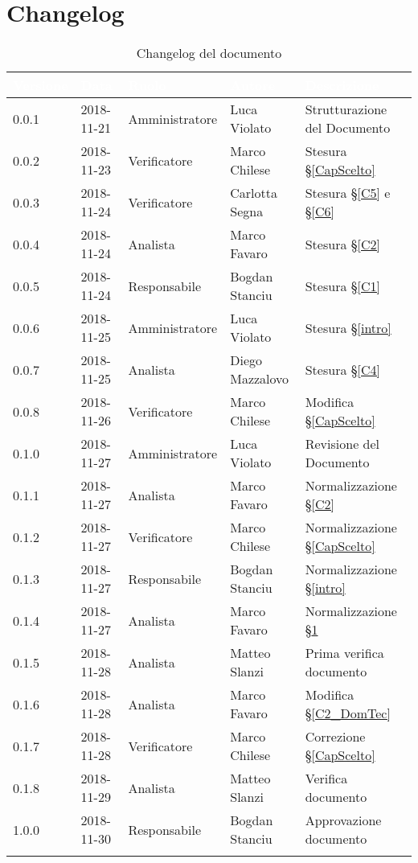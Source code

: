 \section{Changelog}\label{changelog}

\begin{center}
\begin{longtable}[c]{|m{}|m{}|m{}|m{}|p{}|}
\hline
\rowcolor{bluelogo}\textbf{\textcolor{white}{Versione}} & \textbf{\textcolor{white}{Data}}  & \textbf{\textcolor{white}{Ruolo}} & \textbf{\textcolor{white}{Autore}} & \textbf{\textcolor{white}{Descrizione}} \\
\hline \hline
\endfirsthead
0.0.1 & 2018-11-21  & Amministratore & Luca Violato & Strutturazione del Documento \\
\hline
\rowcolor{grigio}0.0.2 & 2018-11-23  & Verificatore & Marco Chilese & Stesura §\ref{CapScelto} \\
\hline
0.0.3 & 2018-11-24  & Verificatore & Carlotta Segna & Stesura §\ref{C5} e §\ref{C6} \\
\hline
\rowcolor{grigio}0.0.4 & 2018-11-24  & Analista & Marco Favaro & Stesura §\ref{C2} \\
\hline
0.0.5 & 2018-11-24  & Responsabile & Bogdan Stanciu & Stesura §\ref{C1}\\
\hline
\rowcolor{grigio}0.0.6 & 2018-11-25  & Amministratore & Luca Violato & Stesura §\ref{intro}\\
\hline
0.0.7 & 2018-11-25  & Analista & Diego Mazzalovo & Stesura §\ref{C4} \\
\hline
\rowcolor{grigio}0.0.8 & 2018-11-26  & Verificatore & Marco Chilese & Modifica §\ref{CapScelto} \\
\hline
0.1.0 & 2018-11-27  & Amministratore & Luca Violato & Revisione del Documento\\
\hline
\rowcolor{grigio}0.1.1 & 2018-11-27 & Analista & Marco Favaro  & Normalizzazione §\ref{C2}\\
\hline
0.1.2 & 2018-11-27  & Verificatore & Marco Chilese & Normalizzazione §\ref{CapScelto}\\
\hline
\rowcolor{grigio}0.1.3 & 2018-11-27  & Responsabile & Bogdan Stanciu & Normalizzazione §\ref{intro}\\
\hline
0.1.4 & 2018-11-27  & Analista & Marco Favaro & Normalizzazione §\ref{changelog}\\
\hline
\rowcolor{grigio}0.1.5 & 2018-11-28 & Analista & Matteo Slanzi & Prima verifica documento\\
\hline
0.1.6 & 2018-11-28 & Analista & Marco Favaro & Modifica §\ref{C2_DomTec}\\
\hline
\rowcolor{grigio}0.1.7 & 2018-11-28 & Verificatore & Marco Chilese  & Correzione §\ref{CapScelto}\\
\hline
0.1.8 & 2018-11-29 & Analista & Matteo Slanzi  & Verifica documento\\
\hline
\rowcolor{grigio}1.0.0 & 2018-11-30 & Responsabile & Bogdan Stanciu & Approvazione documento\\
\hline
\caption{Changelog del documento}
\end{longtable}
\end{center}
